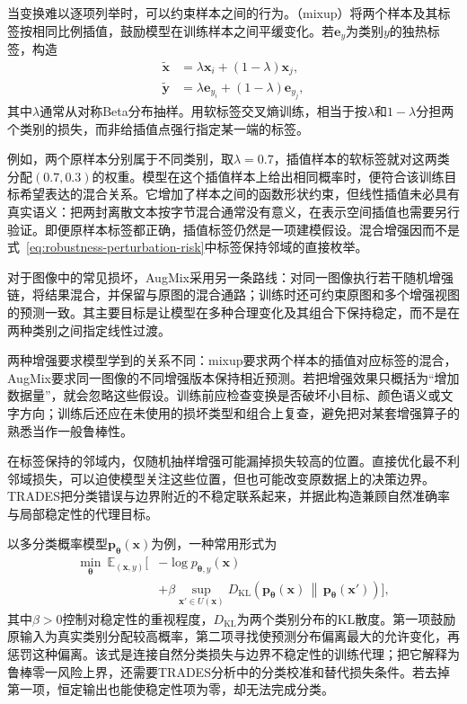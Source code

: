 当变换难以逐项列举时，可以约束样本之间的行为。（mixup）将两个样本及其标签按相同比例插值，鼓励模型在训练样本之间平缓变化。若$\bm{e}_{y}$为类别$y$的独热标签，构造
\begin{equation}
 \begin{aligned}
  \widetilde{\bm{x}}&=\lambda\bm{x}_i+(1-\lambda)\bm{x}_j,\\
  \widetilde{\bm{y}}&=\lambda\bm{e}_{y_i}
                         +(1-\lambda)\bm{e}_{y_j},
 \end{aligned}
 \label{eq:robustness-mixup}
\end{equation}
其中$\lambda$通常从对称Beta分布抽样。用软标签交叉熵训练，相当于按$\lambda$和$1-\lambda$分担两个类别的损失，而非给插值点强行指定某一端的标签。

例如，两个原样本分别属于不同类别，取$\lambda=0.7$，插值样本的软标签就对这两类分配$(0.7,0.3)$的权重。模型在这个插值样本上给出相同概率时，便符合该训练目标希望表达的混合关系。它增加了样本之间的函数形状约束，但线性插值未必具有真实语义：把两封离散文本按字节混合通常没有意义，在表示空间插值也需要另行验证。即便原样本标签都正确，插值标签仍然是一项建模假设。混合增强因而不是式~\eqref{eq:robustness-perturbation-risk}中标签保持邻域的直接枚举。

对于图像中的常见损坏，AugMix采用另一条路线：对同一图像执行若干随机增强链，将结果混合，并保留与原图的混合通路；训练时还可约束原图和多个增强视图的预测一致。其主要目标是让模型在多种合理变化及其组合下保持稳定，而不是在两种类别之间指定线性过渡。

两种增强要求模型学到的关系不同：mixup要求两个样本的插值对应标签的混合，AugMix要求同一图像的不同增强版本保持相近预测。若把增强效果只概括为“增加数据量”，就会忽略这些假设。训练前应检查变换是否破坏小目标、颜色语义或文字方向；训练后还应在未使用的损坏类型和组合上复查，避免把对某套增强算子的熟悉当作一般鲁棒性。

在标签保持的邻域内，仅随机抽样增强可能漏掉损失较高的位置。直接优化最不利邻域损失，可以迫使模型关注这些位置，但也可能改变原数据上的决策边界。TRADES把分类错误与边界附近的不稳定联系起来，并据此构造兼顾自然准确率与局部稳定性的代理目标。

以多分类概率模型$\bm{p}_{\bm{\theta}}(\bm{x})$为例，一种常用形式为
\begin{equation}
 \begin{aligned}
 \min_{\bm{\theta}}\ \mathbb E_{(\bm{x},y)}
 \bigg[&-\log p_{\bm{\theta},y}(\bm{x})\\
 &+\beta\sup_{\bm{x}'\in U(\bm{x})}
 D_{\mathrm{KL}}\!\left(
 \bm{p}_{\bm{\theta}}(\bm{x})
 \,\middle\|\,
 \bm{p}_{\bm{\theta}}(\bm{x}')\right)\bigg],
 \end{aligned}
 \label{eq:robustness-trades}
\end{equation}
其中$\beta>0$控制对稳定性的重视程度，$D_{\mathrm{KL}}$为两个类别分布的KL散度。第一项鼓励原输入为真实类别分配较高概率，第二项寻找使预测分布偏离最大的允许变化，再惩罚这种偏离。该式是连接自然分类损失与边界不稳定性的训练代理；把它解释为鲁棒零一风险上界，还需要TRADES分析中的分类校准和替代损失条件。若去掉第一项，恒定输出也能使稳定性项为零，却无法完成分类。


